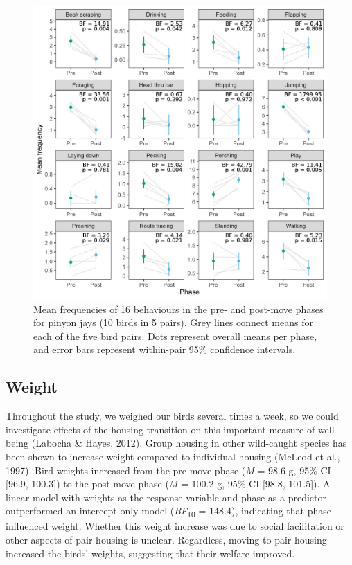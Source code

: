 \documentclass[
  pub]{apa6}
\begin{document}
\begin{figure}

{\centering \includegraphics[width=1\linewidth]{figures/behavior_freq_phase} 

}

\caption{Mean frequencies of 16 behaviours in the pre- and post-move phases for pinyon jays (10 birds in 5 pairs). Grey lines connect means for each of the five bird pairs. Dots represent overall means per phase, and error bars represent within-pair 95\% confidence intervals.}\label{fig:behavior-fig}
\end{figure}

\subsection{Weight}\label{weight}

Throughout the study, we weighed our birds several times a week, so we could investigate effects of the housing transition on this important measure of well-being (Labocha \& Hayes, 2012). Group housing in other wild-caught species has been shown to increase weight compared to individual housing (McLeod et al., 1997). Bird weights increased from the pre-move phase (\emph{M} = 98.6 g, 95\% CI {[}96.9, 100.3{]}) to the post-move phase (\emph{M} = 100.2 g, 95\% CI {[}98.8, 101.5{]}). A linear model with weights as the response variable and phase as a predictor outperformed an intercept only model (\emph{BF}\textsubscript{10} = 148.4), indicating that phase influenced weight. Whether this weight increase was due to social facilitation or other aspects of pair housing is unclear. Regardless, moving to pair housing increased the birds' weights, suggesting that their welfare improved.
\end{document}
